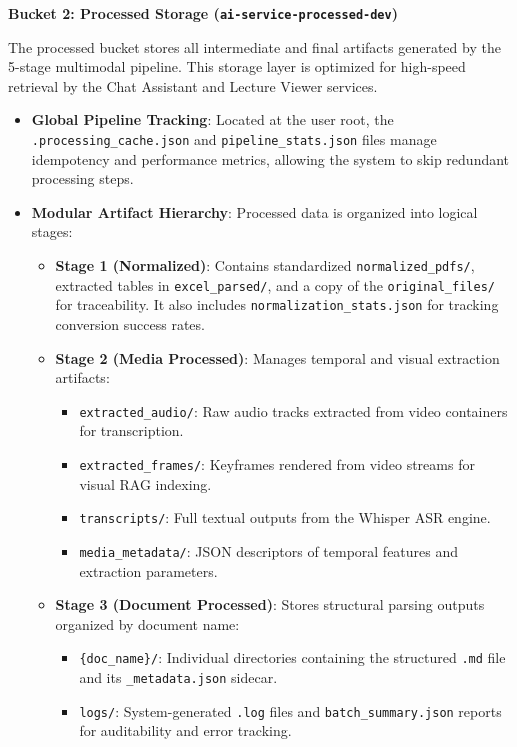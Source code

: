 \textbf{Bucket 2: Processed Storage (\texttt{ai-service-processed-dev})}

The processed bucket stores all intermediate and final artifacts generated by the 5-stage multimodal pipeline. This storage layer is optimized for high-speed retrieval by the Chat Assistant and Lecture Viewer services.

\begin{itemize}
    \item \textbf{Global Pipeline Tracking}: Located at the user root, the \texttt{.processing\_cache.json} and \texttt{pipeline\_stats.json} files manage idempotency and performance metrics, allowing the system to skip redundant processing steps.
    \item \textbf{Modular Artifact Hierarchy}: Processed data is organized into logical stages:
    \begin{itemize}
        \item \textbf{Stage 1 (Normalized)}: Contains standardized \texttt{normalized\_pdfs/}, extracted tables in \texttt{excel\_parsed/}, and a copy of the \texttt{original\_files/} for traceability. It also includes \texttt{normalization\_stats.json} for tracking conversion success rates.
        \item \textbf{Stage 2 (Media Processed)}: Manages temporal and visual extraction artifacts:
        \begin{itemize}
            \item \texttt{extracted\_audio/}: Raw audio tracks extracted from video containers for transcription.
            \item \texttt{extracted\_frames/}: Keyframes rendered from video streams for visual RAG indexing.
            \item \texttt{transcripts/}: Full textual outputs from the Whisper ASR engine.
            \item \texttt{media\_metadata/}: JSON descriptors of temporal features and extraction parameters.
        \end{itemize}
        \item \textbf{Stage 3 (Document Processed)}: Stores structural parsing outputs organized by document name:
        \begin{itemize}
            \item \texttt{\{doc\_name\}/}: Individual directories containing the structured \texttt{.md} file and its \texttt{\_metadata.json} sidecar.
            \item \texttt{logs/}: System-generated \texttt{.log} files and \texttt{batch\_summary.json} reports for auditability and error tracking.

\end{itemize}
\end{itemize}
\end{itemize}
